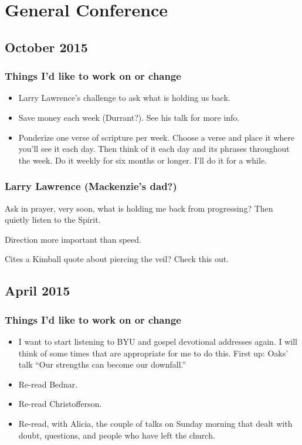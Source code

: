 \section{General Conference} %

\subsection{October 2015}

\subsubsection{Things I'd like to work on or change}

\begin{itemize}
\item Larry Lawrence's challenge to ask what is holding us back.
\item Save money each week (Durrant?). See his talk for more info.
\item Ponderize one verse of scripture per week. Choose a verse and place it where you'll see it each day. Then think of it each day and its phrases throughout the week. Do it weekly for six months or longer. I'll do it for a while.
\end{itemize}

\subsubsection{Larry Lawrence (Mackenzie's dad?)}

Ask in prayer, very soon, what is holding me back from progressing? Then quietly listen to the Spirit.

Direction more important than speed.

Cites a Kimball quote about piercing the veil? Check this out.

\subsection{April 2015}

\subsubsection{Things I'd like to work on or change}

\begin{itemize}
\item I want to start listening to BYU and gospel devotional addresses again. I will think of some times that are appropriate for me to do this. First up: Oaks' talk ``Our strengths can become our downfall.''
\item Re-read Bednar.
\item Re-read Christofferson.
\item Re-read, with Alicia, the couple of talks on Sunday morning that dealt with doubt, questions, and people who have left the church.
\end{itemize}

